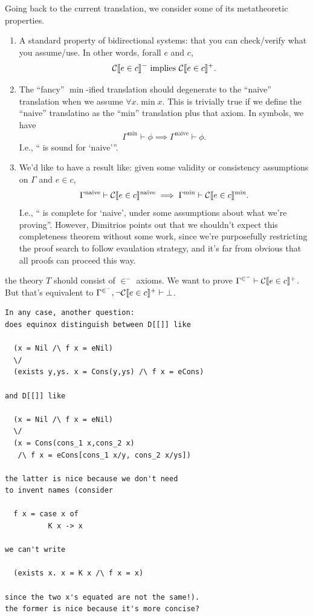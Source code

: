 \documentclass[preprint]{sigplanconf}
\begin{document}
Going back to the current translation, we consider some of its
metatheoretic properties.
\protect \begin{enumerate}
\item A standard
  property of bidirectional systems: that you can check/verify what you assume/use.
  In other words, forall $e$ and $c$,
  \protect \[
  \mathcal{C} \llbracket e \in c \rrbracket^- \text{ implies } \mathcal{C} \llbracket e \in c \rrbracket^+.
  \]
\item The ``fancy'' $\min{}$-ified translation should 
  degenerate to the ``naive'' translation when we assume $\forall x. \min{x}$.
  This is trivially true if we define the ``naive'' translatino as the ``min'' translation
  plus that axiom.  In symbols, we have
  \protect \[
  \Gamma^\text{min} \vdash \phi \implies \Gamma^\text{naive} \vdash \phi.
  \]  I.e., ``\min{} is sound for `naive'''.
\item We'd like to have a result  like: given some validity or consistency 
  assumptions on $\Gamma$ and $e \in c$,
  \protect \[
    \Gamma^\text{naive} \vdash \mathcal{C} \llbracket e \in c \rrbracket^\text{naive} \implies \Gamma^\text{min} \vdash \mathcal{C} \llbracket e \in c \rrbracket^\text{min}.
  \]  I.e., ``\min{} is complete for `naive', under some assumptions about 
  what we're proving''.  However, Dimitrios points out that we shouldn't expect this
  completeness theorem without some work, since we're purposefully 
  restricting the proof search to follow
  evaulation strategy, and it's far from obvious that all proofs can proceed this way.
\end{enumerate}

  the theory $T$ should consist of $\in^-$ axioms.
  We want to prove $\Gamma^{\in^-} \vdash \mathcal{C} \llbracket e \in c \rrbracket^+$.  
  But
  that's equivalent to $\Gamma^{\in^-},\lnot\mathcal{C} \llbracket e \in c \rrbracket^+ \vdash \bot$.  


\begin{verbatim}
In any case, another question: 
does equinox distinguish between D[[]] like

  (x = Nil /\ f x = eNil)
  \/
  (exists y,ys. x = Cons(y,ys) /\ f x = eCons)

and D[[]] like

  (x = Nil /\ f x = eNil)
  \/
  (x = Cons(cons_1 x,cons_2 x)
   /\ f x = eCons[cons_1 x/y, cons_2 x/ys])

the latter is nice because we don't need 
to invent names (consider

  f x = case x of
          K x -> x

we can't write

  (exists x. x = K x /\ f x = x)

since the two x's equated are not the same!). 
the former is nice because it's more concise?
\end{verbatim}
\end{document}

